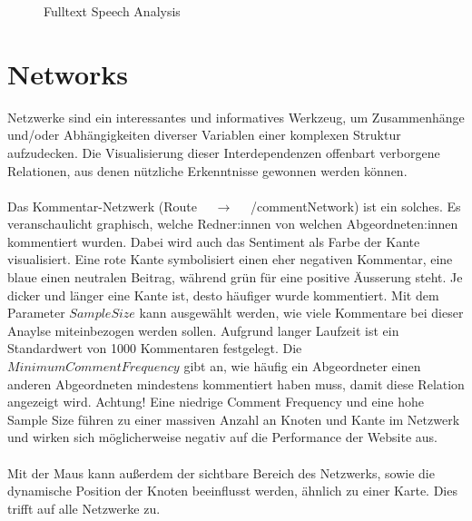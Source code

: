 \documentclass[10pt]{report}
\begin{document}
\begin{figure}[H]
	\begin{center}		
  	 \end{center}
	\caption{Fulltext Speech Analysis}	
 \end{figure}

\pagebreak

\section{Networks}

Netzwerke sind ein interessantes und informatives Werkzeug, um Zusammenhänge und/oder Abhängigkeiten diverser Variablen einer komplexen Struktur aufzudecken. 
Die Visualisierung dieser Interdependenzen offenbart verborgene Relationen, aus denen nützliche  Erkenntnisse gewonnen werden können.\\\\
Das Kommentar-Netzwerk (Route $\quad\rightarrow\quad$  /commentNetwork) ist ein solches. Es veranschaulicht graphisch, welche Redner:innen von welchen Abgeordneten:innen kommentiert wurden. 
Dabei wird auch das Sentiment als Farbe der Kante visualisiert. Eine rote Kante symbolisiert einen eher negativen Kommentar, eine blaue einen neutralen Beitrag, während grün für eine positive Äusserung steht.
Je dicker und länger eine Kante ist, desto häufiger wurde kommentiert.
Mit dem Parameter $Sample Size$ kann ausgewählt werden, wie viele Kommentare bei dieser Anaylse miteinbezogen werden sollen. Aufgrund langer Laufzeit ist ein Standardwert von 1000 Kommentaren festgelegt.
Die $Minimum Comment Frequency$ gibt an, wie häufig ein Abgeordneter einen anderen Abgeordneten mindestens kommentiert haben muss, damit diese Relation angezeigt wird.
Achtung! Eine niedrige Comment Frequency und eine hohe Sample Size führen zu einer massiven Anzahl an Knoten und Kante im Netzwerk und wirken sich möglicherweise negativ auf die Performance der Website aus.\\\\ 
Mit der Maus kann außerdem der sichtbare Bereich des Netzwerks, sowie die dynamische Position der Knoten beeinflusst werden, ähnlich zu einer Karte. Dies trifft auf alle Netzwerke zu.\\\\
\end{document}
